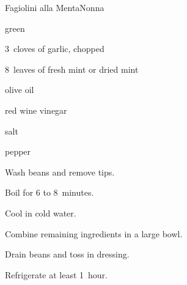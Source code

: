 \begin{recipe}{Fagiolini alla Menta}{Nonna}{}

\begin{ingredients}
\item {} green 
\item 3~cloves of garlic, chopped
\item 8~leaves of fresh mint or  dried mint
\item \C{\half} olive oil
\item \C{\quarter} red wine vinegar
\item salt
\item pepper
\end{ingredients}

\begin{directions}
\item Wash beans and remove tips.
\item Boil for 6 to 8~minutes.
\item Cool in cold water.
\item Combine remaining ingredients in a large bowl.
\item Drain beans and toss in dressing.
\item Refrigerate at least 1~hour.
\end{directions}

\end{recipe}
